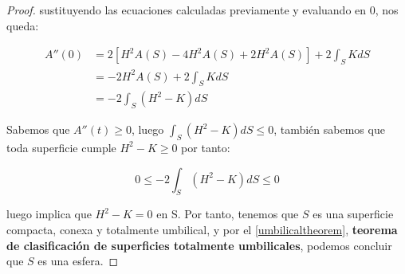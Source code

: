 \begin{proof}
sustituyendo las ecuaciones calculadas previamente y evaluando en 0, nos queda:

\begin{align*}
    A''(0) &= 2\left[ H^2A(S) -4H^2A(S) + 2H^2A(S) \right] + 2\int_S KdS \\
    &= -2H^2A(S) + 2\int_S KdS \\
    &= -2\int_S (H^2-K) dS
\end{align*}

Sabemos que $A''(t) \geq 0$, luego $\int_S (H^2-K) dS \leq 0$, también sabemos que toda superficie cumple $H^2-K \geq 0$ por tanto:

\begin{equation*}
    0 \leq -2\int_S (H^2-K) dS \leq 0
\end{equation*}

luego implica que $H^2-K = 0$ en S. Por tanto, tenemos que $S$ es una superficie compacta, conexa y totalmente umbilical, y por el \autoref{umbilicaltheorem}, \textbf{teorema de clasificación de superficies totalmente umbilicales}, podemos concluir que $S$ es una esfera.

\end{proof}